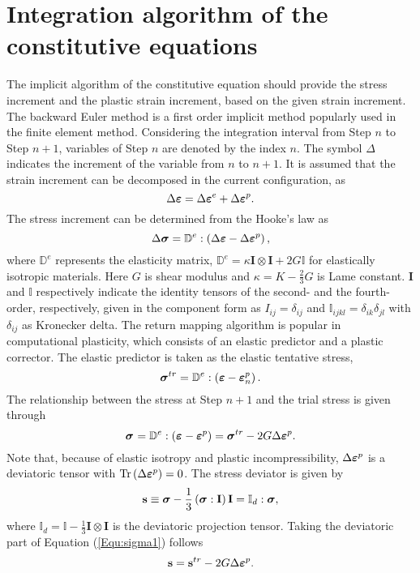 \documentclass[preprint,5p,twocolumn,11pt,sort&compress]{elsarticle}
\newcommand{\bfsigma}{{\mbox{\boldmath{$\sigma$}}}}
\newcommand{\bfepsilon}{{\mbox{\boldmath{$\varepsilon$}}}}
\newcommand{\bfs}{{\bf s}}
\begin{document}
\section{Integration algorithm of the constitutive equations}
\label{}
The implicit algorithm of the constitutive equation should provide the stress increment and the plastic strain increment, based on the given strain increment.
The backward Euler method is a first order implicit method popularly used in the finite element method. Considering the integration interval from Step $n$ to Step $n+1$, variables of Step $n$ are denoted by the index $n$. The symbol $\Delta$ indicates the increment of the variable from $n$ to $n+1$. It is assumed that the strain increment can be decomposed in the current configuration, as
\begin{equation}
{\Delta\bfepsilon} = \Delta\bfepsilon^e + \Delta\bfepsilon^p.
\end{equation}
The stress increment can be determined from the Hooke's law as
\begin{equation}
\label{Equ:sigman+1}
\Delta\bfsigma= {\mathbb{D}^e}:\left( {{\Delta\bfepsilon} - \Delta\bfepsilon^p} \right),
\end{equation}
where $\mathbb{D}^e$ represents the elasticity matrix, ${\mathbb{D}^e} = \kappa {\mathbf{I}} \otimes {\mathbf{I}} + 2G\mathbb{I}$ for elastically isotropic materials. Here $G$ is shear modulus and  $\kappa  = K - \frac{2}{3}G$  is Lame constant. ${\mathbf{I}}$ and $\mathbb{I}$ respectively indicate the identity tensors of the second- and the fourth-order, respectively, given in the component form as ${I_{ij}} = {\delta _{ij}}$ and ${\mathbb{I}_{ijkl}} = {\delta _{ik}}{\delta _{jl}}$ with ${\delta _{ij}}$ as Kronecker delta.
The return mapping algorithm is popular in computational plasticity, which consists of an elastic predictor and a plastic corrector. The elastic predictor is taken as the elastic tentative stress,
\begin{equation}
{\bfsigma}^{tr} = {\mathbb{D}^e}:\left( {{\bfepsilon} - \bfepsilon_n^p} \right).
\end{equation}
The relationship between the stress at Step $n+1$  and the trial stress is given through
\begin{equation}
\label{Equ:sigma1}
{{\bfsigma}^{} = {\mathbb{D}^e}:\left( {\bfepsilon^{} - \bfepsilon^p} \right)} = {\bfsigma}^{tr} - 2G\Delta \bfepsilon^p.
\end{equation}
Note that, because of elastic isotropy and plastic incompressibility, $\Delta \bfepsilon^p$ is a deviatoric tensor with ${\rm Tr}\left( {\Delta \bfepsilon^p} \right)=0$.
The stress deviator is given by
\begin{equation}
\bfs \equiv {\bfsigma} - \frac{1}{3}\left( {{\bfsigma}:{\mathbf{I}}} \right){\mathbf{I}} = {\mathbb{I}_d}:{\bfsigma},
\end{equation}
where ${\mathbb{I}_d} = \mathbb{I} - \frac{1}{3}{\mathbf{I}} \otimes {\mathbf{I}}$ is the deviatoric projection tensor.
Taking the deviatoric part of Equation (\ref{Equ:sigma1}) follows
\begin{equation}\label{Equ:sminusa1}
{\bfs} = \bfs^{tr} - 2G\Delta \bfepsilon^p.
\end{equation}
\end{document}
